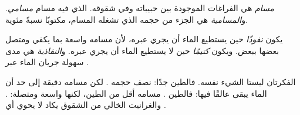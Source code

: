 \begin{definition}[المسامية]\label{def:g6:water-underground:porosity}
\emph{مسام}  هي الفراغات الموجودة بين حبيباته
وفي شقوقه.  الذي فيه مسام  \emph{مسامي}. و\emph{المسامية}
هي الجزء من حجمه الذي تشغله المسام،
مكتوبًا نسبةً مئوية.
\end{definition}

\begin{definition}[النفاذية]\label{def:g6:water-underground:permeability}
يكون  \emph{نفوذًا} حين يستطيع الماء أن يجري عبره،
لأن مسامه واسعة بما يكفي ومتصل بعضها ببعض. ويكون
\emph{كتيمًا} حين لا يستطيع الماء أن يجري عبره.
و\emph{النفاذية} هي مدى سهولة جريان الماء عبر
.
\end{definition}

الفكرتان ليستا الشيء نفسه. فالطين  جدًا: نصف حجمه
. لكن مسامه دقيقة إلى حد أن الماء يبقى عالقًا
فيها: فالطين \emph{}.  مسامه أقل من  الطين، لكنها
واسعة ومتصلة:  \emph{}. والغرانيت الخالي من الشقوق
يكاد لا يحوي أي .

